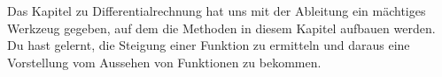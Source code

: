 \documentclass[../../main.tex]{subfiles}
\begin{document}
Das Kapitel zu Differentialrechnung hat uns mit der Ableitung ein mächtiges Werkzeug gegeben, auf dem die
Methoden in diesem Kapitel aufbauen werden. Du hast gelernt, die Steigung einer Funktion zu ermitteln und daraus eine 
Vorstellung vom Aussehen von Funktionen zu bekommen.
\end{document}
